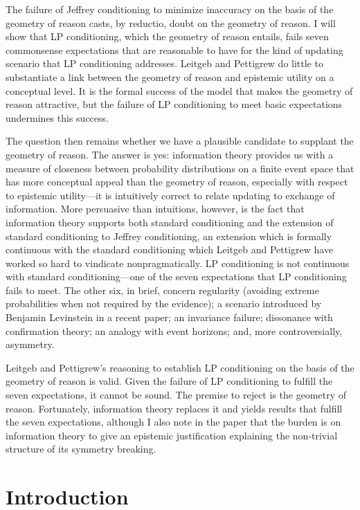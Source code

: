 \documentclass[11pt]{article} \usepackage{october} \onehalfspacing
\begin{document}
The failure of Jeffrey conditioning to minimize inaccuracy on the
basis of the geometry of reason casts, by reductio, doubt on the
geometry of reason. I will show that LP conditioning, which the
geometry of reason entails, fails seven commonsense expectations that
are reasonable to have for the kind of updating scenario that LP
conditioning addresses. Leitgeb and Pettigrew do little to
substantiate a link between the geometry of reason and epistemic
utility on a conceptual level. It is the formal success of the model
that makes the geometry of reason attractive, but the failure of LP
conditioning to meet basic expectations undermines this success.

The question then remains whether we have a plausible candidate to
supplant the geometry of reason. The answer is yes: information theory
provides us with a measure of closeness between probability
distributions on a finite event space that has more conceptual appeal
than the geometry of reason, especially with respect to epistemic
utility---it is intuitively correct to relate updating to exchange of
information. More persuasive than intuitions, however, is the fact
that information theory supports both standard conditioning and the
extension of standard conditioning to Jeffrey conditioning, an
extension which is formally continuous with the standard conditioning
which Leitgeb and Pettigrew have worked so hard to vindicate
nonpragmatically. LP conditioning is not continuous with standard
conditioning---one of the seven expectations that LP conditioning
fails to meet. The other six, in brief, concern regularity (avoiding
extreme probabilities when not required by the evidence); a scenario
introduced by Benjamin Levinstein in a recent paper; an invariance
failure; dissonance with confirmation theory; an analogy with event
horizons; and, more controversially, asymmetry.

Leitgeb and Pettigrew's reasoning to establish LP conditioning on the
basis of the geometry of reason is valid. Given the failure of LP
conditioning to fulfill the seven expectations, it cannot be sound.
The premise to reject is the geometry of reason. Fortunately,
information theory replaces it and yields results that fulfill the
seven expectations, although I also note in the paper that the burden
is on information theory to give an epistemic justification explaining
the non-trivial structure of its symmetry breaking.

\newpage

\section{Introduction}
\label{intr}
\end{document}
